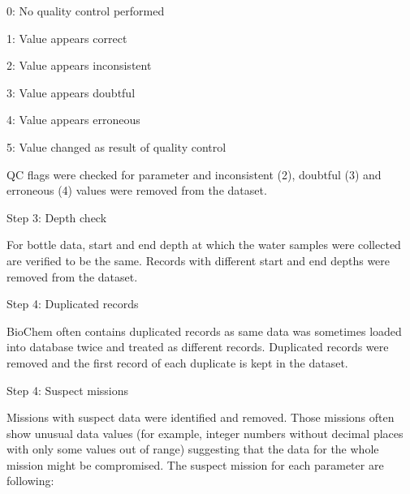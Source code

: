 \documentclass[letterpaper,portrait,12pt]{scrartcl}
\numberwithin{equation}{section}		%
\numberwithin{figure}{section}			%
\numberwithin{table}{section}				%
\begin{document}
0: No quality control performed




1: Value appears correct




2: Value appears inconsistent




3: Value appears doubtful




4: Value  appears erroneous




5: Value changed as result of quality control









QC flags were checked for parameter and inconsistent (2), doubtful (3) and erroneous (4) values were removed from the dataset.









Step 3: Depth check




For bottle data, start and end depth at which the water samples were collected are verified to be the same. Records with different start and end depths were removed from the dataset.









Step 4: Duplicated records




BioChem often contains duplicated records as same data was sometimes loaded into database twice and treated as different records. Duplicated records were removed and the first record of each duplicate is kept in the dataset.









Step 4: Suspect missions




Missions with suspect data were identified and removed. Those missions often show unusual data values (for example, integer numbers without decimal places with only some values out of range) suggesting that the data for the whole mission might be compromised. The suspect mission for each parameter are following:
\end{document}
